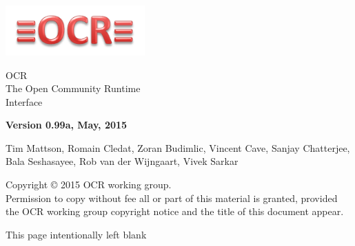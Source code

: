 
\begin{titlepage}
  \begin{flushleft}
    \hspace{-6em} \includegraphics[width=0.4\textwidth]{ocr-logo.png}
  \end{flushleft}

  \begin{adjustwidth}{-0.75in}{0in}
    \begin{center}
      \Huge
      \textsf{OCR\\The Open Community Runtime \\Interface}

      \vspace{0.5in}\textsf{ }\vspace{-0.7in}
      \normalsize
      \vspace{1.0in}
      \textbf{Version 0.99a, May, 2015}
      \vspace{1.0in}

Tim Mattson, Romain Cledat, Zoran Budimlic,
Vincent Cave, Sanjay Chatterjee,  Bala Seshasayee, Rob van der Wijngaart,
Vivek Sarkar
    \end{center}
  \end{adjustwidth}
  \vspace{2.0in}

  \begin{adjustwidth}{0pt}{1em}\setlength{\parskip}{0.25\baselineskip}%
Copyright © 2015 OCR working group.\\
Permission to copy without fee all or part of this material is granted,
provided the OCR working group copyright notice and
the title of this document appear.
  \end{adjustwidth}
\end{titlepage}


\clearpage
\thispagestyle{empty}
\phantom{a}
This page intentionally left blank
\vfill